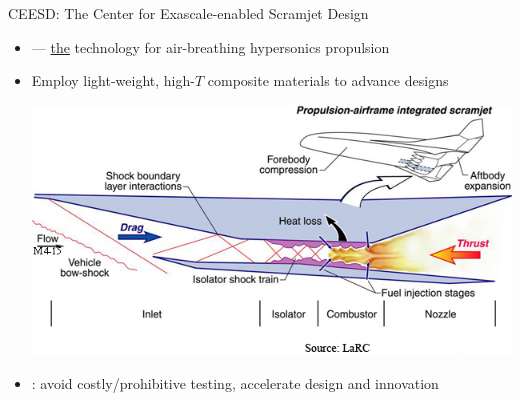 \documentclass[aspectratio=169]{beamer}
\begin{document}
\begin{frame}{CEESD:  The Center for Exascale-enabled Scramjet Design}
\begin{itemize}
\item {} --- \underline{the} technology for air-breathing
  hypersonics propulsion

\item Employ light-weight, high-$T$ composite materials to advance designs

\begin{center}
\begin{minipage}{0.45\textwidth}
\includegraphics[width=\textwidth]{figures/scramjet-LaRC.png}
\end{minipage}
\hfil
\begin{minipage}{0.45\textwidth}
\end{minipage}
\end{center}

  \item {}:  avoid costly/prohibitive testing,
    accelerate design and innovation
\end{itemize}
\end{frame}
\end{document}
